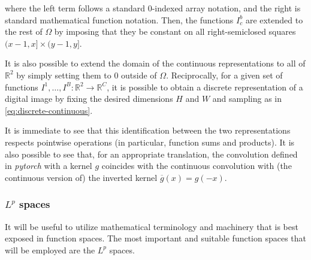 \documentclass[twocolumn,twoside,a4paper,10pt]{IEEEtran}
\begin{document}
where the left term follows a standard \(0\)-indexed array notation, and the right is standard mathematical function notation. Then, the functions \(I^b_c\) are extended to the rest of \(\Omega\) by imposing that they be constant on all right-semiclosed squares \((x-1,x]\times(y-1, y]\).

It is also possible to extend the domain of the continuous representations to all of \(\mathbb{R}^2\) by simply setting them to \(0\) outside of \(\Omega\). Reciprocally, for a given set of functions \(I^1, \dots, I^B\colon \mathbb{R}^2\to \mathbb{R}^C\), it is possible to obtain a discrete representation of a digital image by fixing the desired dimensions \(H\) and \(W\) and sampling as in \cref{eq:discrete-continuous}.

It is immediate to see that this identification between the two representations respects pointwise operations (in particular, function sums and products). It is also possible to see that, for an appropriate translation, the convolution defined in \textit{pytorch} with a kernel \(g\) coincides with the continuous convolution with (the continuous version of) the inverted kernel \(\overline{g}(x) = g(-x)\).

\subsubsection{\(L^p\) spaces}
It will be useful to utilize mathematical terminology and machinery that is best exposed in function spaces. The most important and suitable function spaces that will be employed are the \(L^p\) spaces.
\end{document}
